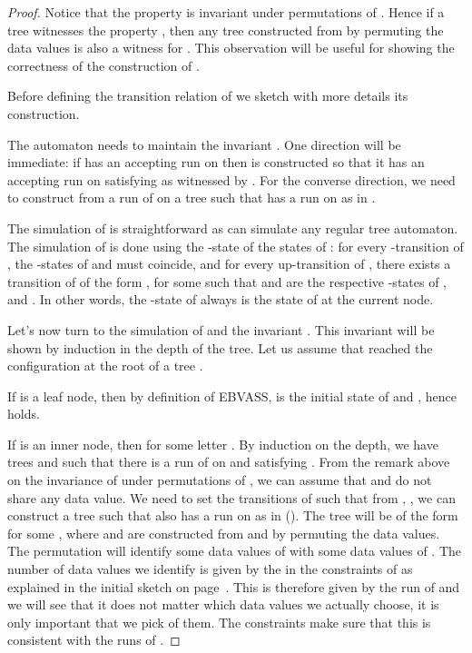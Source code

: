 \documentclass{CSML}
\newcommand\ebvass{\textup{EBVASS}\xspace}
\begin{document}
\begin{proof}
Notice that the property  is invariant under permutations of .
Hence if a tree  witnesses the property , then any tree
 constructed from  by permuting the data values is also a
witness for .  This observation will be useful for showing the
correctness of the construction of .

 
Before defining the transition relation of  we sketch with more details its
construction.

The automaton  needs to maintain the invariant .  One direction
will be immediate: if  has an accepting run on  then
 is constructed so that it has an accepting run on  satisfying
 as witnessed by . For the converse direction, we need to
construct from a run of  on  a tree  such that
 has a run on  as in .

The simulation of  is straightforward as  can simulate any regular
tree automaton. The simulation of  is done using the -state of the
states of : for every -transition  of , the
-states of  and  must coincide, and for every up-transition
 of , there exists a transition of  of the form
, for some  such that  and  are
the respective -states of ,  and . In other words, the
-state of  always is the state of  at the current node.

Let's now turn to the simulation of  and the invariant .
This invariant will be shown by induction in the depth of the tree.
Let us assume that  reached the configuration  
at the root  of a tree .

If  is a leaf node, then by definition of \ebvass, 
 is the initial state  of  
and ,
hence  holds.

If  is an inner node, then  for some letter
.  By induction on the depth, we have trees 
and  such that there is a run of  on  and  satisfying . 
From the remark above on the invariance of  under permutations of , 
we can assume that  and 
do not share any data value.
We need to set the transitions of  such that from , ,
we can construct a tree  such that  also has 
a run on  as in (). The tree  will
be of the form  for some , where 
and  are constructed from  and  by permuting
the data values. The permutation will identify some data values of 
with some data values of . The number of data values we identify is
given by the  in the constraints of  as explained in the initial
sketch on page~\pageref{sketch:sec-dad-counter}. 
This  is therefore given by the run of  and we will see that it does not
matter which data values we actually choose, it is only important that we pick
 of them. The constraints make sure that this is consistent with the runs of .


\end{proof}
\end{document}
